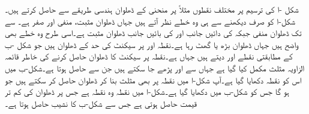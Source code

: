 شکل -ا کی ترسیم پر مختلف نقطوں مثلاً  پر منحنی کے ڈھلوان ہندسی طریقے سے حاصل کرتے ہیں۔شکل-ا کو صرف  دیکھنے سے  ہی وہ خطے نظر آتے ہیں جہاں ڈھلوان مثبت، منفی اور صفر ہے۔  سے  تک ڈھلوان منفی   جبکہ   کی دائیں جانب اور  کی بائیں جانب  ڈھلوان مثبت ہے۔اسی طرح وہ خطے بھی واضح ہیں جہاں ڈھلوان بڑھ یا گھٹ رہا ہے۔نقطہ  اور  پر سیکنٹ کی حد کے  ڈھلوان  ہیں جو شکل -ب کے مطابقتی نقطے  اور  دیتے ہیں جہاں  ہے۔نقطہ  پر سیکنٹ کا ڈھلوان حاصل کرنے کی خاطر قائمہ الزاویہ مثلث مکمل کیا گیا ہے جہاں سے  اور  پڑھے جا سکتے ہیں جن سے  حاصل ہوتا ہے۔شکل-ب میں اس کو نقطہ  دکھایا گیا ہے۔آپ شکل-ا میں نقطہ  پر بھی مثلث بنا کر ڈھلوان حاصل کر سکتے ہیں جو  ہو گا جس کو شکل-ب میں  دکھایا گیا ہے۔شکل-ا میں نقطہ  وہ نقطہ ہے جس پر ڈھلوان کی کم تر قیمت حاصل ہوتی ہے جس سے شکل-ب کا نشیب  حاصل ہوتا ہے۔  

